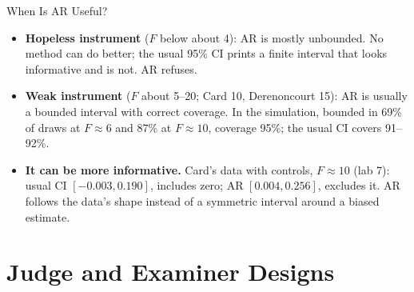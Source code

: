 \documentclass[aspectratio=169,11pt,xcolor=dvipsnames]{beamer}
\newcommand{\srcp}[1]{{\scriptsize\color{gray}(#1)}}
\begin{document}
\begin{frame}{When Is AR Useful?}
\begin{itemize}\itemsep4pt
  \item \textbf{Hopeless instrument} ($F$ below about 4): AR is mostly
        unbounded. No method can do better; the usual 95\% CI prints a finite
        interval that looks informative and is not. AR refuses.
  \item \textbf{Weak instrument} ($F$ about 5--20; Card 10, Derenoncourt 15): AR is
        usually a bounded interval with correct coverage. In the simulation,
        bounded in 69\% of draws at $F \approx 6$ and 87\% at $F \approx 10$,
        coverage 95\%; the usual CI covers 91--92\%.
  \item \textbf{It can be more informative.} Card's data with controls,
        $F \approx 10$ \srcp{lab 7}: usual CI $[-0.003, 0.190]$, includes zero;
        AR $[0.004, 0.256]$, excludes it. AR follows the data's shape instead
        of a symmetric interval around a biased estimate.
\end{itemize}
\end{frame}


\section[Judge IV]{Judge and Examiner Designs}
\begin{frame}\sectionpage\end{frame}
\end{document}

